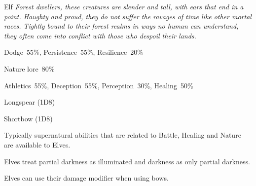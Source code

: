 \newpage


\begin{monsterbox}{Elf}
	\textit{Forest dwellers, these creatures are slender and tall, with ears that end in a point. Haughty and proud, they do not suffer the ravages of time like other mortal races. Tightly bound to their forest realms in ways no human can understand, they often come into conflict with those who despoil their lands.}\\
	\rpghline
	\basics[%
        hitpoints  = 11, 
	majorwound = 6,
	damagemodifier = 0,
	powerpoints = 13,
	movementrate = 15m,
	armor = Leather (2AP),
	plunderrating = 1
	]
	\rpghline%
	\stats[ %
		STR = 2D6+3 (10),
		CON = 3D6   (11),
		DEX = 3D6+6 (17),
		SIZ = 2D6+3 (10),
		INT = 3D6+6 (17),
		POW = 2D6+6 (13),
		CHA = 3D6   (11)
	]
	\rpghline%
	\begin{rpg-monsteraction}[Resistances]
		Dodge~55\%, Persistence~55\%, Resilience~20\%
	\end{rpg-monsteraction}
	\begin{rpg-monsteraction}[Knowledge]
    		Nature lore~80\%
	\end{rpg-monsteraction}
	\begin{rpg-monsteraction}[Practical]
		Athletics~55\%, Deception~55\%, Perception~30\%, Healing~50\%
	\end{rpg-monsteraction}
	\begin{rpg-monsteraction}
		Longspear (1D8)
	\end{rpg-monsteraction}
	\begin{rpg-monsteraction}
		Shortbow (1D8)
	\end{rpg-monsteraction}
	\begin{rpg-monsteraction}[Supernatural]
		Typically supernatural abilities that are related to Battle, Healing and Nature are available to Elves.
	\end{rpg-monsteraction}
	\begin{rpg-monsteraction}
		Elves treat partial darkness as illuminated and darkness as only partial darkness.
	\end{rpg-monsteraction}
	\begin{rpg-monsteraction}
		Elves can use their damage modifier when using bows.
	\end{rpg-monsteraction}

\end{monsterbox}

